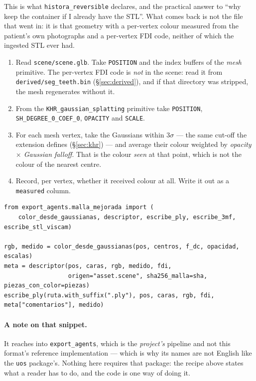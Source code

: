 \documentclass[11pt,a4paper]{article}
\newcommand{\code}[1]{\texttt{\small #1}}
\begin{document}
This is what \code{histora\_reversible} declares, and the practical answer to ``why keep the
container if I already have the STL''. What comes back is not the file that went in: it is
that geometry with a per-vertex colour measured from the patient's own photographs and a
per-vertex FDI code, neither of which the ingested STL ever had.

\begin{enumerate}
  \item Read \code{scene/scene.glb}. Take \code{POSITION} and the index buffers of the
  \emph{mesh} primitive. The per-vertex FDI code is \emph{not} in the scene: read it from
  \code{derived/seg\_teeth.bin} (\S\ref{sec:derived}), and if that directory was stripped,
  the mesh regenerates without it.
  \item From the \code{KHR\_gaussian\_splatting} primitive take \code{POSITION},
  \code{SH\_DEGREE\_0\_COEF\_0}, \code{OPACITY} and \code{SCALE}.
  \item For each mesh vertex, take the Gaussians within $3\sigma$ --- the same cut-off the
  extension defines (\S\ref{sec:khr}) --- and average their colour weighted by
  \emph{opacity $\times$ Gaussian falloff}. That is the colour \emph{seen} at that point,
  which is not the colour of the nearest centre.
  \item Record, per vertex, whether it received colour at all. Write it out as a
  \code{measured} column.
\end{enumerate}

\begin{lstlisting}[style=py]
from export_agents.malla_mejorada import (
    color_desde_gaussianas, descriptor, escribe_ply, escribe_3mf, escribe_stl_viscam)

rgb, medido = color_desde_gaussianas(pos, centros, f_dc, opacidad, escalas)
meta = descriptor(pos, caras, rgb, medido, fdi,
                  origen="asset.scene", sha256_malla=sha, piezas_con_color=piezas)
escribe_ply(ruta.with_suffix(".ply"), pos, caras, rgb, fdi, meta["comentarios"], medido)
\end{lstlisting}

\paragraph{A note on that snippet.} It reaches into \code{export\_agents}, which is the
\emph{project's} pipeline and not this format's reference implementation --- which is why
its names are not English like the \code{uos} package's. Nothing here requires that
package: the recipe above states what a reader has to do, and the code is one way of doing
it.
\end{document}
